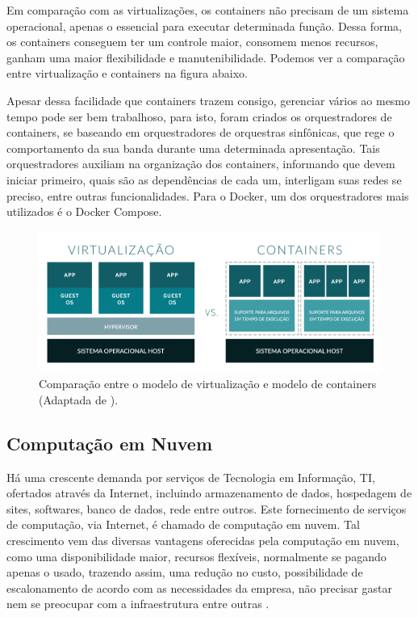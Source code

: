 Em comparação com as virtualizações, os containers não precisam de um sistema operacional, apenas o essencial para executar determinada função. Dessa forma, os containers conseguem ter um controle maior, consomem menos recursos, ganham uma maior flexibilidade e manutenibilidade. Podemos ver a comparação entre virtualização e containers na figura abaixo.

Apesar dessa facilidade que containers trazem consigo, gerenciar vários ao mesmo tempo pode ser bem trabalhoso, para isto, foram criados os orquestradores de containers, se baseando em orquestradores de orquestras sinfônicas, que rege o comportamento da sua banda durante uma determinada apresentação. Tais orquestradores auxiliam na organização dos containers, informando que devem iniciar primeiro, quais são as dependências de cada um, interligam suas redes se preciso, entre outras funcionalidades. Para o Docker, um dos orquestradores mais utilizados é o Docker Compose.

\begin{figure}[H]
  \centering
  \includegraphics[width=.80\textwidth]{assets/virtualization-vs-containers.png} 
  \caption{Comparação entre o modelo de virtualização e modelo de containers (Adaptada de \cite{redhat2020Containers}).}
  \label{fig:virtualization-vs-containers}
\end{figure}


\subsection{Computação em Nuvem}
\label{fund:nuvem}
Há uma crescente demanda por serviços de Tecnologia em Informação, TI, ofertados através da Internet, incluindo armazenamento de dados, hospedagem de sites, softwares, banco de dados, rede entre outros. Este fornecimento de serviços de computação, via Internet, é chamado de computação em nuvem. Tal crescimento vem das diversas vantagens oferecidas pela computação em nuvem, como uma disponibilidade maior, recursos flexíveis, normalmente se pagando apenas o usado, trazendo assim, uma redução no custo, possibilidade de escalonamento de acordo com as necessidades da empresa, não precisar gastar nem se preocupar com a infraestrutura entre outras \cite{sousa2009computaccao}.

